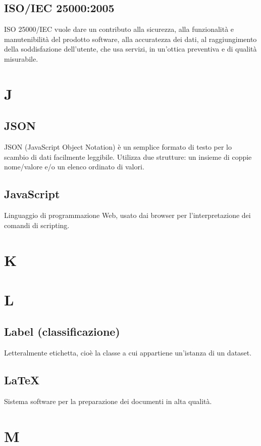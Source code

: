 \documentclass{classes/base}
\begin{document}
        \subsection*{ISO/IEC 25000:2005}
        ISO 25000/IEC vuole dare un contributo alla sicurezza, alla funzionalità e manutenibilità del prodotto software, alla accuratezza dei dati, al raggiungimento della soddisfazione dell'utente, che usa servizi, in un'ottica preventiva e di qualità misurabile.
        
        \newpage  
    \section{J}
    	\subsection*{JSON}
    	JSON (JavaScript Object Notation) è un semplice formato di testo per lo scambio di dati facilmente leggibile. Utilizza due strutture: un insieme di coppie nome/valore e/o un elenco ordinato di valori.

        \subsection*{JavaScript}
        Linguaggio di programmazione Web, usato dai browser per l'interpretazione dei comandi di scripting.
    
    \newpage  
    \section{K}
    \newpage  
    \section{L}
        \subsection*{Label (classificazione)}
        Letteralmente etichetta, cioè la classe a cui appartiene un'istanza di un dataset.
        
        \subsection*{LaTeX}
        Sistema software per la preparazione dei documenti in alta qualità.

    \newpage  
    \section{M} 
\end{document}
